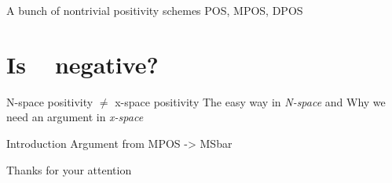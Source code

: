 \documentclass[9pt]{beamer}
\DeclareMathOperator{\msbar}{\overline{MS}}
\begin{document}
\begin{frame}{A bunch of nontrivial positivity schemes}
    POS, MPOS, DPOS
\end{frame}

\section{Is $\msbar$ negative?}
\begin{frame}{N-space positivity $\neq$ x-space positivity}
    The easy way in \textit{N-space} and Why we need an argument in \textit{x-space}
\end{frame}

\begin{frame}{Introduction}
    Argument from MPOS -> MSbar
\end{frame}


\begin{frame}[standout]
	Thanks for your attention
\end{frame}
\end{document}
